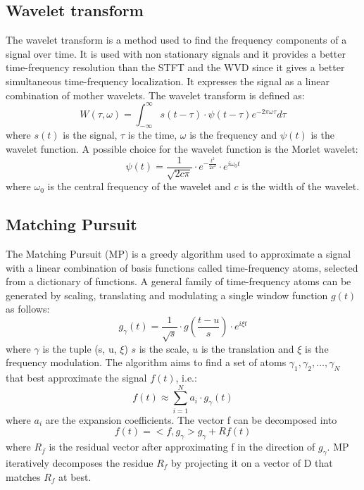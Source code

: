 \documentclass[a4paper]{sapthesis}
\begin{document}
\subsection{Wavelet transform}\label{sec:wavelet}
The wavelet transform\cite{wavelet} is a method used to find the frequency
components of a signal over time. It is used with non stationary signals and it
provides a better time-frequency resolution than the STFT and the WVD 
since it gives a better simultaneous time-frequency localization. \newline
It expresses the signal as a linear combination of mother wavelets.
The wavelet transform is defined as:
\begin{equation}
\label{eq:wavelet}
W(\tau, \omega) = \int_{-\infty}^{\infty} s(t-\tau) \cdot \psi(t-\tau) e^{-2\pi\omega \tau} d\tau
\end{equation}
where $s(t)$ is the signal, $\tau$ is the time, $\omega$ is the frequency
and $\psi(t)$ is the wavelet function. \newline
A possible choice for the wavelet function is the Morlet wavelet:
\begin{equation}
\label{eq:wavelet2}
\psi(t) = \frac{1}{\sqrt{2c\pi}} \cdot e^{-\frac{t^2}{2c^2}} \cdot e^{i\omega_0 t}
\end{equation}
where $\omega_0$ is the central frequency of the wavelet and $c$ is the
width of the wavelet. \newline

\subsection{Matching Pursuit}\label{sec:mp}
The Matching Pursuit (MP)\cite{mp} is a greedy algorithm used to approximate a
signal with a linear combination of basis functions called time-frequency 
atoms, selected from a dictionary of functions. \newline
A general family of time-frequency atoms can be generated by scaling, translating 
and modulating a single window function $g(t)$ as follows:
\begin{equation}
\label{eq:mp}
g_{\gamma}(t) = \frac{1}{\sqrt{s}} \cdot g(\frac{t-u}{s}) \cdot e^{i\xi t}
\end{equation}
where $\gamma$ is the tuple (s, u, $\xi$) $s$ is the scale, $u$ is the
translation and $\xi$ is the frequency modulation. \newline
The algorithm aims to find a set of atoms $\gamma_1, \gamma_2, \dots, \gamma_N$
that best approximate the signal $f(t)$, i.e.:
\begin{equation}
\label{eq:mp2}
f(t) \approx \sum_{i=1}^{N} a_i \cdot g_{\gamma}(t)
\end{equation}
where $a_i$ are the expansion coefficients. \newline
The vector f can be decomposed into 
\begin{equation}
\label{eq:mp3}
f(t) = <f, g_{\gamma}>g_{\gamma} + Rf(t)
\end{equation}
where $R_{f}$ is the residual vector after approximating f in the direction
 of $g_{\gamma}$. \newline
MP iteratively decomposes the residue $R_{f}$  by projecting it on a vector
of D that matches $R_{f}$ at best. \newline
\end{document}
